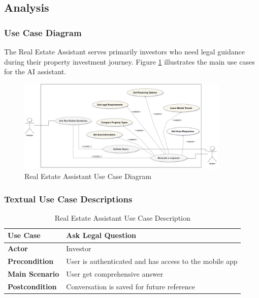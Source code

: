 \subsection{Analysis}
\subsubsection{Use Case Diagram}
The Real Estate Assistant serves primarily investors who need legal guidance during their property investment journey. Figure \ref{fig:assistant-use-case} illustrates the main use cases for the AI assistant.
\newpage
\begin{figure}[htbp]
    \centering
    \includegraphics[width=0.9\textwidth]{images/assistant_use_case_diagram.png}
    \caption{Real Estate Assistant Use Case Diagram}
    \label{fig:assistant-use-case}
\end{figure}

\subsubsection{Textual Use Case Descriptions}

\begin{table}[htbp]
    \centering
    \begin{tabular}{|p{3cm}|p{10cm}|}
        \hline
        \textbf{Use Case} & \textbf{Ask Legal Question} \\
        \hline
        \textbf{Actor} & Investor \\
        \hline
        \textbf{Precondition} & User is authenticated and has access to the mobile app \\
        \hline
        \textbf{Main Scenario} & User get comprehensive answer \\
        \hline
        \textbf{Postcondition} & Conversation is saved for future reference \\
        \hline
    \end{tabular}
    \caption{Real Estate Assistant Use Case Description}
    \label{tab:assistant-use-case}
\end{table}

